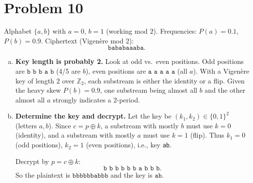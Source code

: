 \section*{Problem 10}

Alphabet $\{a,b\}$ with $a=0$, $b=1$ (working mod $2$). Frequencies: $P(a)=0.1$, $P(b)=0.9$. Ciphertext (Vigen\`ere mod 2):
\[
\texttt{bababaaaba}.
\]

\begin{enumerate}[(a)]
\item \textbf{Key length is probably 2.}
Look at odd vs.\ even positions. Odd positions are $\texttt{b b b a b}$ (4/5 are $b$), even positions are $\texttt{a a a a a}$ (all $a$).
With a Vigen\`ere key of length $2$ over $\mathbb{Z}_2$, each substream is either the identity or a flip. Given the heavy skew $P(b)=0.9$, one substream being almost all $b$ and the other almost all $a$ strongly indicates a 2-period.

\item \textbf{Determine the key and decrypt.}
Let the key be $(k_1,k_2)\in\{0,1\}^2$ (letters $a,b$). Since $c=p\oplus k$,
a substream with mostly $b$ must use $k=0$ (identity), and a substream with mostly $a$ must use $k=1$ (flip).
Thus $k_1=0$ (odd positions), $k_2=1$ (even positions), i.e., key \texttt{ab}.

Decrypt by $p=c\oplus k$:
\[
\texttt{b b b b b b a b b b}.
\]
So the plaintext is \(\boxed{\texttt{bbbbbbabbb}}\) and the key is \(\boxed{\texttt{ab}}\).
\end{enumerate}
